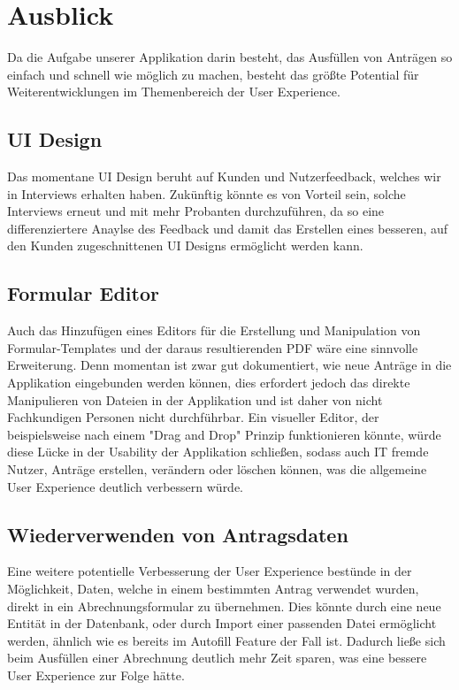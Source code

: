 \chapter{Ausblick}\label{ch:ausblick}

Da die Aufgabe unserer Applikation darin besteht, das Ausfüllen von Anträgen so einfach 
und schnell wie möglich zu machen, besteht das größte Potential für Weiterentwicklungen
im Themenbereich der User Experience.

\section{\ac{UI} Design}\label{sec: ui design}
Das momentane \ac{UI} Design beruht auf Kunden und Nutzerfeedback, welches wir in 
Interviews erhalten haben. Zukünftig könnte es von Vorteil sein, solche Interviews 
erneut und mit mehr Probanten durchzuführen, da so eine differenziertere Anaylse
des Feedback und damit das Erstellen eines besseren, auf den Kunden zugeschnittenen \ac{UI} 
Designs ermöglicht werden kann.%

\section{Formular Editor}\label{sec: formular editor}
Auch das Hinzufügen eines Editors für die Erstellung und Manipulation von 
Formular-Templates und der daraus resultierenden PDF wäre eine sinnvolle Erweiterung. Denn 
momentan ist zwar gut dokumentiert, wie neue Anträge in die Applikation eingebunden werden 
können, dies erfordert jedoch das direkte Manipulieren von Dateien in der Applikation 
und ist daher von nicht Fachkundigen Personen nicht durchführbar. Ein visueller Editor, der 
beispielsweise nach einem "Drag and Drop" Prinzip funktionieren könnte, würde diese Lücke 
in der Usability der Applikation schließen, sodass auch IT fremde Nutzer, Anträge 
erstellen, verändern oder löschen können, was die allgemeine User Experience deutlich 
verbessern würde.

\section{Wiederverwenden von Antragsdaten}\label{sec: wiederverwenden von Antragsdaten}
Eine weitere potentielle Verbesserung der User Experience bestünde in der Möglichkeit, 
Daten, welche in einem bestimmten Antrag verwendet wurden, direkt in ein 
Abrechnungsformular zu übernehmen. Dies könnte durch eine neue Entität in der Datenbank, 
oder durch Import einer passenden Datei ermöglicht werden, ähnlich wie es bereits im 
Autofill Feature der Fall ist. Dadurch ließe sich beim Ausfüllen einer Abrechnung deutlich 
mehr Zeit sparen, was eine bessere User Experience zur Folge hätte.%